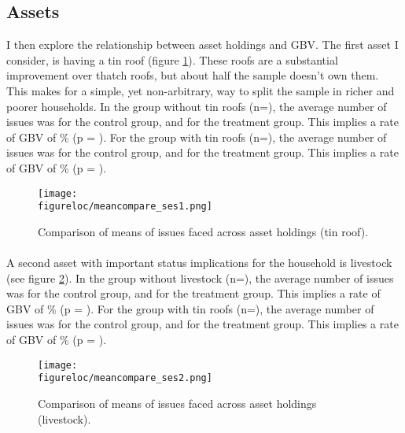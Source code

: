 \documentclass[11pt,a4paper]{scrartcl} %
\newcommand{\figureloc}{C:/Users/Koen/Dropbox/PhD/Papers/CongoGBV/Figures}
\begin{document}
\subsection*{Assets}
I then explore the relationship between asset holdings and GBV. The first asset I consider, is having a tin roof (figure \ref{fig:meancompare_ses1}). These roofs are a substantial improvement over thatch roofs, but about half the sample doesn't own them. This makes for a simple, yet non-arbitrary, way to split the sample in richer and poorer households.   In the group without tin roofs (n=), the average number of issues was  for the control group, and  for the treatment group. This implies a rate of GBV of \% (p = ). For the group with tin roofs (n=), the average number of issues was  for the control group, and  for the treatment group. This implies a rate of GBV of \% (p = ).

\begin{figure}[H]
  \texttt{[image: \\figureloc/meancompare\_ses1.png]}
  \caption{Comparison of means of issues faced across asset holdings (tin roof).}
  \label{fig:meancompare_ses1}
\end{figure}

\paragraph{}
A second asset with important status implications for the household is livestock (see figure \ref{fig:meancompare_ses2}).  In the group without livestock (n=), the average number of issues was  for the control group, and  for the treatment group. This implies a rate of GBV of \% (p = ). For the group with tin roofs (n=), the average number of issues was  for the control group, and  for the treatment group. This implies a rate of GBV of \% (p = ).

\begin{figure}[H]
\texttt{[image: \\figureloc/meancompare\_ses2.png]}
  \caption{Comparison of means of issues faced across asset holdings (livestock).}
  \label{fig:meancompare_ses2}
\end{figure}
\end{document}
